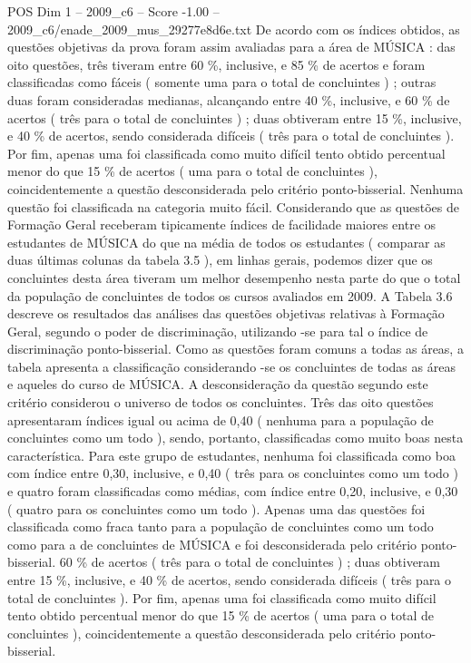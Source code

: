 \begin{textsample}{POS Dim 1 – 2009\_c6 – Score -1.00 – 2009\_c6/enade\_2009\_mus\_29277e8d6e.txt}
De acordo com os índices obtidos, as questões objetivas da prova foram assim avaliadas para a área de MÚSICA : das oito questões, três tiveram entre 60 \%, inclusive, e 85 \% de acertos e foram classificadas como fáceis ( somente uma para o total de concluintes ) ; outras duas foram consideradas medianas, alcançando entre 40 \%, inclusive, e 60 \% de acertos ( três para o total de concluintes ) ; duas obtiveram entre 15 \%, inclusive, e 40 \% de acertos, sendo considerada difíceis ( três para o total de concluintes ).
Por fim, apenas uma foi classificada como muito difícil tento obtido percentual menor do que 15 \% de acertos ( uma para o total de concluintes ), coincidentemente a questão desconsiderada pelo critério ponto-bisserial.
Nenhuma questão foi classificada na categoria muito fácil.
Considerando que as questões de Formação Geral receberam tipicamente índices de facilidade maiores entre os estudantes de MÚSICA do que na média de todos os estudantes ( comparar as duas últimas colunas da tabela 3.5 ), em linhas gerais, podemos dizer que os concluintes desta área tiveram um melhor desempenho nesta parte do que o total da população de concluintes de todos os cursos avaliados em 2009.
A Tabela 3.6 descreve os resultados das análises das questões objetivas relativas à Formação Geral, segundo o poder de discriminação, utilizando -se para tal o índice de discriminação ponto-bisserial.
Como as questões foram comuns a todas as áreas, a tabela apresenta a classificação considerando -se os concluintes de todas as áreas e aqueles do curso de MÚSICA.
A desconsideração da questão segundo este critério considerou o universo de todos os concluintes.
Três das oito questões apresentaram índices igual ou acima de 0,40 ( nenhuma para a população de concluintes como um todo ), sendo, portanto, classificadas como muito boas nesta característica.
Para este grupo de estudantes, nenhuma foi classificada como boa com índice entre 0,30, inclusive, e 0,40 ( três para os concluintes como um todo ) e quatro foram classificadas como médias, com índice entre 0,20, inclusive, e 0,30 ( quatro para os concluintes como um todo ).
Apenas uma das questões foi classificada como fraca tanto para a população de concluintes como um todo como para a de concluintes de MÚSICA e foi desconsiderada pelo critério ponto-bisserial. 60 \% de acertos ( três para o total de concluintes ) ; duas obtiveram entre 15 \%, inclusive, e 40 \% de acertos, sendo considerada difíceis ( três para o total de concluintes ).
Por fim, apenas uma foi classificada como muito difícil tento obtido percentual menor do que 15 \% de acertos ( uma para o total de concluintes ), coincidentemente a questão desconsiderada pelo critério ponto-bisserial.

\end{textsample}
